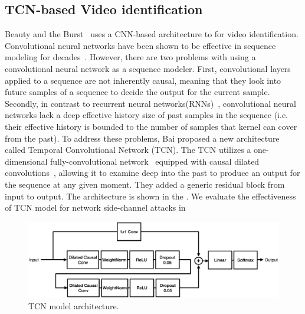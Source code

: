 \subsection{TCN-based Video identification}
Beauty and the Burst~\cite{schuster2017beautyburst} uses a CNN-based architecture to for video identification. 
Convolutional neural networks have been shown to be effective in sequence modeling for decades~\cite{hinton1990connectionist}.
However, there are two problems with using a convolutional neural network as a sequence modeler.
First, convolutional layers applied to a sequence are not inherently causal, meaning that they look into future samples of a sequence to decide the output for the current sample.
Secondly, in contrast to recurrent neural networks(RNNs)~\cite{elman1990finding}, convolutional neural networks lack a deep effective history size of past samples in the sequence (i.e. their effective history is bounded to the number of samples that kernel can cover from the past).
To address these problems, Bai proposed a new architecture called Temporal Convolutional Network (TCN).
The TCN utilizes a one-dimensional fully-convolutional network~\cite{long2015fully} equipped with causal dilated convolutions~\cite{oord2016wavenet}, allowing it to examine deep into the past to produce an output for the sequence at any given moment.
They added a generic residual block from input to output.
The architecture is shown in the .
We evaluate the effectiveness of TCN model for network side-channel attacks in {\addref}




\begin{figure}[t]
  \centering
  \includegraphics[width=\columnwidth]{figures/TCN_arch.pdf}
  \caption{TCN model architecture.}
  \label{fig:tcn-arch}
\end{figure}
